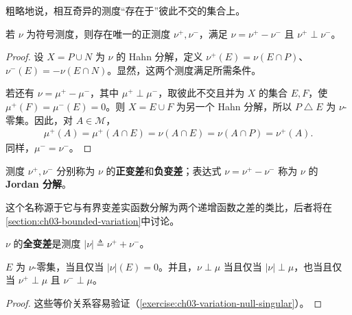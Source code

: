 \documentclass[../../main.tex]{subfiles}%
\begin{document}
\begin{remark}
粗略地说，相互奇异的测度“存在于”彼此不交的集合上。
\end{remark}
\begin{theorem}\label{theorem:ch03-jordan-decomposition}
若 $\nu$ 为符号测度，则存在唯一的正测度 $\nu^+,\nu^-$，满足 $\nu=\nu^+-\nu^-$ 且 $\nu^+\perp\nu^-$。
\end{theorem}
\begin{proof}
设 $X=P\cup N$ 为 $\nu$ 的 Hahn 分解，定义 $\nu^+(E)=\nu(E\cap P)$、$\nu^-(E)=-\nu(E\cap N)$。显然，这两个测度满足所需条件。

若还有 $\nu=\mu^+-\mu^-$，其中 $\mu^+\perp\mu^-$，取彼此不交且并为 $X$ 的集合 $E,F$，使 $\mu^+(F)=\mu^-(E)=0$。则 $X=E\cup F$ 为另一个 Hahn 分解，所以 $P\mathbin{\triangle}E$ 为 $\nu$-零集。因此，对 $A\in\mathscr{M}$，
\begin{align*}
\mu^+(A)=\mu^+(A\cap E)=\nu(A\cap E)=\nu(A\cap P)=\nu^+(A).
\end{align*}
同样，$\mu^-=\nu^-$。
\end{proof}
\begin{definition}\label{definition:ch03-jordan-variations}
测度 $\nu^+,\nu^-$ 分别称为 $\nu$ 的\textbf{正变差}和\textbf{负变差}；表达式 $\nu=\nu^+-\nu^-$ 称为 $\nu$ 的\textbf{Jordan 分解}。
\end{definition}
这个名称源于它与有界变差实函数分解为两个递增函数之差的类比，后者将在\cref{section:ch03-bounded-variation}中讨论。
\begin{definition}[全变差]\label{definition:ch03-total-variation}
$\nu$ 的\textbf{全变差}是测度 $|\nu|\triangleq\nu^++\nu^-$。
\end{definition}
\begin{proposition}\label{proposition:ch03-variation-null-singular}
$E$ 为 $\nu$-零集，当且仅当 $|\nu|(E)=0$。并且，$\nu\perp\mu$ 当且仅当 $|\nu|\perp\mu$，也当且仅当 $\nu^+\perp\mu$ 且 $\nu^-\perp\mu$。
\end{proposition}
\begin{proof}
这些等价关系容易验证（\cref{exercise:ch03-variation-null-singular}）。
\end{proof}
\end{document}
